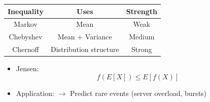 \documentclass[11pt]{article}
\begin{document}
\begin{center}
\begin{tabular}{|c|c|c|}
\hline
Inequality & Uses & Strength \\
\hline
Markov & Mean & Weak \\
Chebyshev & Mean + Variance & Medium \\
Chernoff & Distribution structure & Strong \\
\hline
\end{tabular}
\end{center}

\begin{itemize}
\item Jensen:
\[
f(E[X]) \le E[f(X)]
\]
\item Application:
$\rightarrow$ Predict rare events (server overload, bursts)
\end{itemize}
\end{document}
